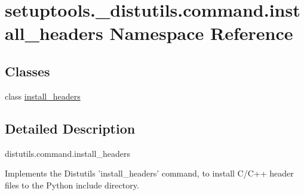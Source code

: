 \hypertarget{namespacesetuptools_1_1__distutils_1_1command_1_1install__headers}{}\section{setuptools.\+\_\+distutils.\+command.\+install\+\_\+headers Namespace Reference}
\label{namespacesetuptools_1_1__distutils_1_1command_1_1install__headers}
\subsection*{Classes}
\begin{DoxyCompactItemize}
\item 
class \hyperlink{classsetuptools_1_1__distutils_1_1command_1_1install__headers_1_1install__headers}{install\+\_\+headers}
\end{DoxyCompactItemize}


\subsection{Detailed Description}
\begin{DoxyVerb}distutils.command.install_headers

Implements the Distutils 'install_headers' command, to install C/C++ header
files to the Python include directory.\end{DoxyVerb}
 